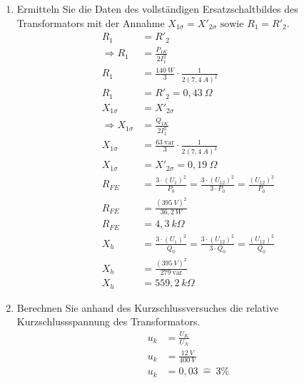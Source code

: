 \begin{enumerate}[label=\alph*)]
	\item Ermitteln Sie die Daten des vollständigen Ersatzschaltbildes des Transformators
	      mit der Annahme $X_{1\sigma} = X'_{2\sigma} \text{ sowie } R_1 = R'_2$.
	      \begin{align*}
		      R_1                     & = R'_2                                                           \\
		      \Rightarrow R_1         & =\frac{P_{1K}}{2I_1^2}                                           \\
		      R_1                     & = \frac{140\ W}{3}\cdot \frac{1}{2(7,4\ A)^2}                    \\
		      R_1                     & = R'_2= 0,43\ \Omega                                             \\
		      X_{1\sigma}             & = X'_{2\sigma}                                                   \\
		      \Rightarrow X_{1\sigma} & =\frac{Q_{1K}}{2I_1^2}                                           \\
		      X_{1\sigma}             & = \frac{63\ \text{var}}{3}\cdot \frac{1}{2(7,4\ A)^2}            \\
		      X_{1\sigma}             & = X'_{2\sigma}= 0,19\ \Omega                                     \\
		      R_{FE}                  & = \frac{3\cdot(U_1)^2}{P_0}=\frac{3\cdot(U_{12})^2}{3 \cdot P_0}
		      = \frac{(U_{12})^2}{P_0}                                                                   \\
		      R_{FE}                  & = \frac{(395\ V)^2}{36,2\ W}                                     \\
		      R_{FE}                  & = 4,3\ k\Omega                                                   \\
		      X_{h}                   & = \frac{3\cdot(U_1)^2}{Q_0}=\frac{3\cdot(U_{12})^2}{3 \cdot Q_0}
		      = \frac{(U_{12})^2}{Q_0}                                                                   \\
		      X_{h}                   & = \frac{(395\ V)^2}{279\ \text{var}}                             \\
		      X_{h}                   & = 559,2\ k\Omega
	      \end{align*}

	\item Berechnen Sie anhand des Kurzschlussversuches die relative Kurzschlussspannung
	      des Transformators.
	      \begin{align*}
		      u_k & = \frac{U_K}{U_N}        \\
		      u_k & = \frac{12\ V}{400\ V}   \\
		      u_k & = 0,03\ \widehat{=}\ 3\%
	      \end{align*}

	      \pagebreak

\end{enumerate}

